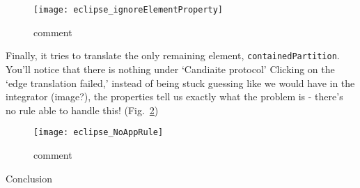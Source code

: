\begin{figure}[htbp]
\begin{center} 
  \texttt{[image: eclipse\_ignoreElementProperty]}
  \caption{comment}  
  \label{eclipse:ignoredElement}
\end{center}
\end{figure}

Finally, it tries to translate the only remaining element, \texttt{containedPartition}. You'll notice that there is nothing under `Candiaite protocol' Clicking
on the `edge translation failed,' instead of being stuck guessing like we would have in the integrator (image?), the properties tell us exactly what the problem
is - there's no rule able to handle this! (Fig.~\ref{eclipse:NoAppRule})

\begin{figure}[htbp]
\begin{center} 
  \texttt{[image: eclipse\_NoAppRule]}
  \caption{comment}  
  \label{eclipse:NoAppRule}
\end{center}
\end{figure}

Conclusion
